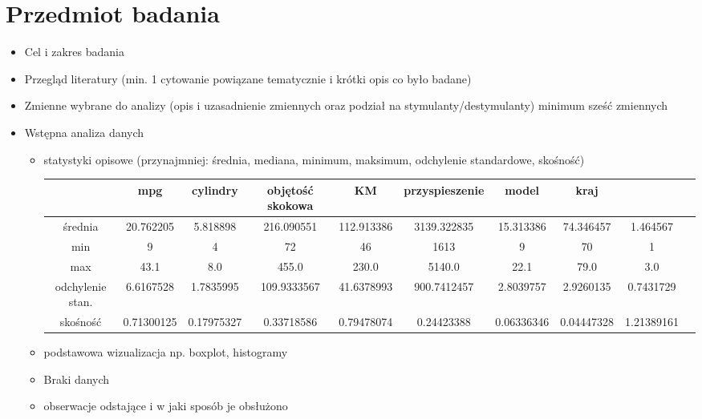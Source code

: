 \documentclass{article}
\begin{document}
\section{Przedmiot badania}
    \begin{itemize}
        \item Cel i zakres badania
        \item Przegląd literatury (min. 1 cytowanie powiązane tematycznie i krótki opis co było badane)
        \item Zmienne wybrane do analizy (opis i uzasadnienie zmiennych oraz podział na stymulanty/destymulanty) minimum sześć zmiennych
        \item Wstępna analiza danych
        \begin{itemize}
            \item statystyki opisowe (przynajmniej: średnia, mediana, minimum, maksimum, odchylenie standardowe, skośność)
                \begin{center}
                \begin{tabular}{ |c|c|c|c|c|c|c|c|c|c| } 
                    \hline
                    & mpg & cylindry & objętość skokowa & KM & przyspieszenie & model & kraj \\
                    \hline
                    średnia & 20.762205  & 5.818898 & 216.090551 & 112.913386 & 3139.322835 & 15.313386 & 74.346457 & 1.464567 \\
                    \hline
                    min & 9 & 4 & 72 & 46 & 1613 & 9 & 70 & 1  \\
                    \hline
                    max & 43.1 & 8.0 & 455.0 & 230.0 & 5140.0 & 22.1 & 79.0 &  3.0  \\
                    \hline
                    odchylenie stan. & 6.6167528 & 1.7835995 & 109.9333567 & 41.6378993 & 900.7412457 & 2.8039757 & 2.9260135 &  0.7431729  \\
                    \hline
                    skośność & 0.71300125 & 0.17975327 & 0.33718586 & 0.79478074 & 0.24423388 & 0.06336346 & 0.04447328 &  1.21389161 \\
                  \hline
                \end{tabular}
                \end{center}
            \item podstawowa wizualizacja np. boxplot, histogramy
            \item Braki danych
            \item obserwacje odstające i w jaki sposób je obsłużono
        \end{itemize}
    \end{itemize}
\end{document}
